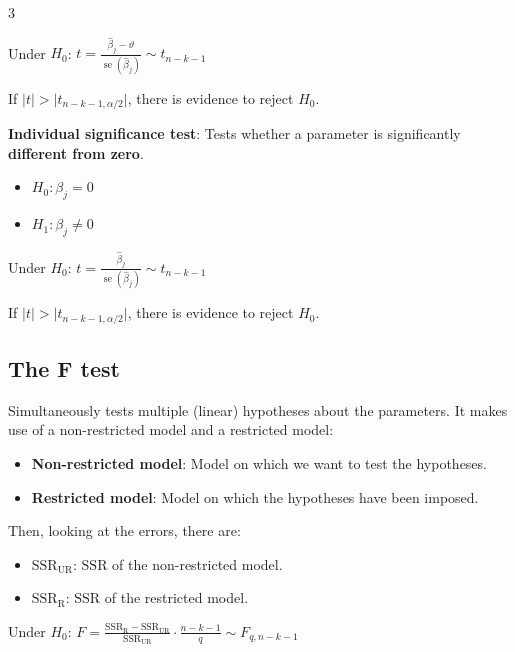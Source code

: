 \documentclass[10pt, a4paper, landscape]{article}
\DeclareMathOperator{\se}{se}
\newcommand{\SSR}{\text{SSR}}
\begin{document}
\begin{multicols}{3}
\begin{center}
	Under \( H_{0} \): \quad \( t = \frac{\hat{\beta}_{j} - \vartheta}{\se(\hat{\beta}_{j})} \sim t_{n - k - 1} \)
\end{center}

If \( \lvert t \rvert > \lvert t_{n - k - 1, \alpha / 2} \rvert \), there is evidence to reject \( H_{0} \).

\textbf{Individual significance test}: Tests whether a parameter is significantly \textbf{different from zero}.

\begin{itemize}[leftmargin=*]
	\item \( H_{0}: \beta_{j} = 0 \)
	\item \( H_{1}: \beta_{j} \neq 0 \)
\end{itemize}

\begin{center}
	Under \( H_{0} \): \quad \( t = \frac{\hat{\beta}_{j}}{\se(\hat{\beta}_{j})} \sim t_{n - k - 1} \)
\end{center}

If \( \lvert t \rvert > \lvert t_{n - k - 1, \alpha / 2} \rvert \), there is evidence to reject \( H_{0} \).

\subsection*{The F test}

Simultaneously tests multiple (linear) hypotheses about the parameters. It makes use of a non-restricted model and a restricted model:

\begin{itemize}[leftmargin=*]
	\item \textbf{Non-restricted model}: Model on which we want to test the hypotheses.
	\item \textbf{Restricted model}: Model on which the hypotheses have been imposed.
\end{itemize}

Then, looking at the errors, there are:

\begin{itemize}[leftmargin=*]
	\item \textbf{\( \SSR_{\text{UR}} \)}: \( \SSR \) of the non-restricted model.
	\item \textbf{\( \SSR_{\text{R}} \)}: \( \SSR \) of the restricted model.
\end{itemize}

\begin{center}
	Under \( H_{0} \): \quad \( F = \frac{\SSR_{\text{R}} - \SSR_{\text{UR}}}{\SSR_{\text{UR}}} \cdot \frac{n - k - 1}{q} \sim F_{q, n - k - 1} \)
\end{center}


\end{multicols}
\end{document}

